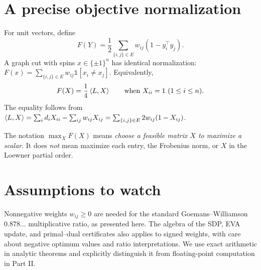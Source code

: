 \section{A precise objective normalization}
For unit vectors, define
\begin{equation}\label{eq:vector-objective}
F(Y)=\frac12\sum_{\{i,j\}\in E}w_{ij}(1-y_i^\top y_j).
\end{equation}
A graph cut with spins $x\in\{\pm1\}^n$ has identical normalization: $F(x)=\sum_{\{i,j\}\in E}w_{ij}\mathbb{1}[x_i\ne x_j]$. Equivalently,
\begin{equation}\label{eq:laplacian-objective}
F(X)=\frac14\left\langle L,X\right\rangle\qquad \text{when }X_{ii}=1\ (1\le i\le n).
\end{equation}
The equality follows from $\left\langle L,X\right\rangle=\sum_id_iX_{ii}-\sum_{ij}w_{ij}X_{ij}=\sum_{\{i,j\}\in E}2w_{ij}(1-X_{ij})$.

\begin{takeaway}
The notation $\max_XF(X)$ means \emph{choose a feasible matrix $X$ to maximize a scalar}. It does \emph{not} mean maximize each entry, the Frobenius norm, or $X$ in the Loewner partial order.
\end{takeaway}

\section{Assumptions to watch}
Nonnegative weights $w_{ij}\ge0$ are needed for the standard Goemans--Williamson $0.878\ldots$ multiplicative ratio, as presented here. The algebra of the SDP, EVA update, and primal--dual certificates also applies to signed weights, with care about negative optimum values and ratio interpretations. We use exact arithmetic in analytic theorems and explicitly distinguish it from floating-point computation in Part II.
